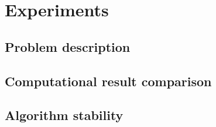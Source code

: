 \section{Experiments}
\subsection{Problem description}


\subsection{Computational result comparison}


\subsection{Algorithm stability}



